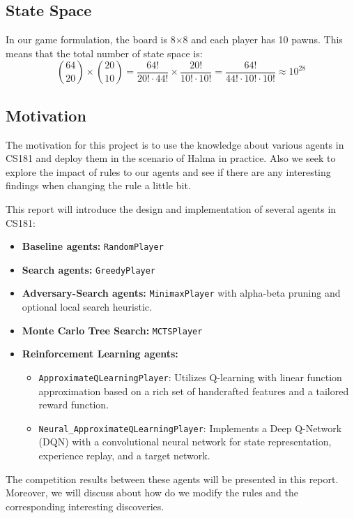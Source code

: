 \subsection{State Space}
In our game formulation, the board is 8$\times$8 and each player has 10 pawns. This means that the total number of state space is:
$$
\binom{64}{20} \times \binom{20}{10} = \frac{64!}{20! \cdot 44!} \times \frac{20!}{10! \cdot 10!} = \frac{64!}{44! \cdot 10! \cdot 10!} \approx 10^{28}
$$
\subsection{Motivation}

The motivation for this project is to use the knowledge about various agents in CS181 and deploy them in the scenario of Halma in practice. Also we seek to explore the impact of rules to our agents and see if there are any interesting findings when changing the rule a little bit. 

This report will introduce the design and implementation of several agents in CS181:
\begin{itemize}
    \item \textbf{Baseline agents:} \texttt{RandomPlayer} \item \textbf{Search agents:} \texttt{GreedyPlayer}
    \item \textbf{Adversary-Search agents:} \texttt{MinimaxPlayer} with alpha-beta pruning and optional local search heuristic.
    \item \textbf{Monte Carlo Tree Search:} \texttt{MCTSPlayer}\cite{DBLP:journals/corr/abs-2103-04931}
    \item \textbf{Reinforcement Learning agents:}
        \begin{itemize}
            \item \texttt{ApproximateQLearningPlayer}: Utilizes Q-learning with linear function approximation based on a rich set of handcrafted features and a tailored reward function.
            \item \texttt{Neural\_ApproximateQLearningPlayer}: Implements a Deep Q-Network (DQN)\cite{DBLP:journals/corr/MnihKSGAWR13} with a convolutional neural network\cite{DBLP:journals/corr/OSheaN15} for state representation, experience replay, and a target network.
        \end{itemize}
\end{itemize}

The competition results between these agents will be presented in this report. Moreover, we will discuss about how do we modify the rules and the corresponding interesting discoveries.
